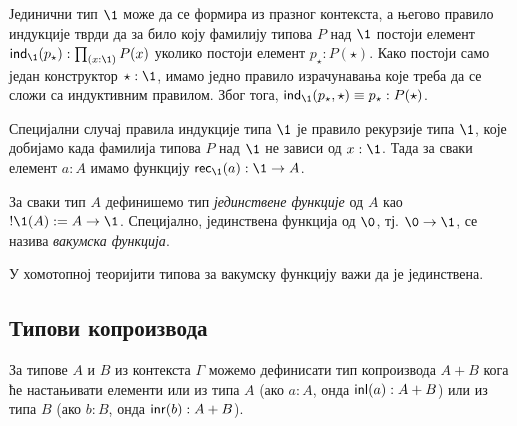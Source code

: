 \documentclass[12pt,oneside]{memoir}
\begin{document}
Јединични тип $\1$ може да се формира из празног контекста, а његово правило индукције тврди да за било коју фамилију типова $P$ над $\1$ постоји елемент $\ind{\1} (p_{\star}) : \prod_{(x : \1)} P (x)$ уколико постоји елемент $p_{\star} : P (\star)$. Како постоји само један конструктор $\star : \1$, имамо једно правило израчунавања које треба да се сложи са индуктивним правилом. Због тога, $\ind{\1} (p_{\star}, \star) \equiv p_{\star} : P(\star)$.

Специјални случај правила индукције типа $\1$ је правило рекурзије типа $\1$, које добијамо када фамилија типова $P$ над $\1$ не зависи од $x : \1$. Тада за сваки елемент $a : A$ имамо функцију $\rec{\1} (a) : \1 \to A$. 

\begin{definition}
    За сваки тип $A$ дефинишемо тип \emph{јединствене функције} од $A$ као $!\1(A) := A \to \1$. Специјално, јединствена функција од $\0$, тј. $\0 \to \1$, се назива \emph{вакумска функција}.
\end{definition}

У хомотопној теоријити типова за вакумску функцију важи да је јединствена. 

\newpage%

\subsection{Типови копроизвода}

За типове $A$ и $B$ из контекста $\Gamma$ можемо дефинисати тип копроизвода $A + B$ кога ће настањивати елементи или из типа $A$ (ако $a : A$, онда $\mathsf{inl}(a) : A + B$) или из типа $B$ (ако $b : B$, онда $\mathsf{inr}(b) : A + B$).
\end{document}
